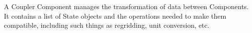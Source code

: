 %


A Coupler Component manages the transformation of data between Components.
It contains a list of State objects and the operations needed to
make them compatible, including such things as regridding, unit
conversion, etc.

